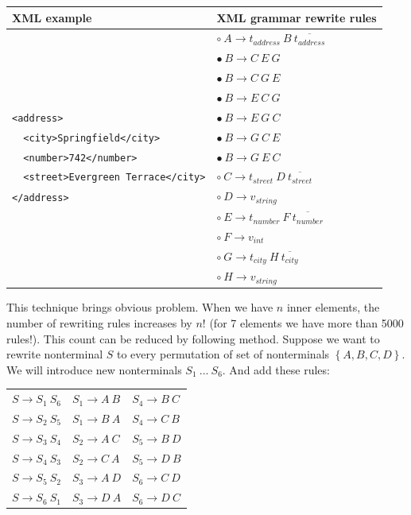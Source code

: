 \documentclass[12pt,notitlepage]{report}
\begin{document}
\begin{center}
\setlength{\tabcolsep}{0.5cm}
\renewcommand{\arraystretch}{1.3}
\begin{tabular}{|l|l|}
\hline
XML example & XML grammar rewrite rules\\ \hline
& $\circ~A \rightarrow t_{address}~B~\overline{t_{address}}$ \\
& $\bullet~B \rightarrow C~E~G$ \\
& $\bullet~B \rightarrow C~G~E$ \\
& $\bullet~B \rightarrow E~C~G$ \\
\texttt{<address>} & $\bullet~B \rightarrow E~G~C$ \\
\texttt{~~<city>Springfield</city>} & $\bullet~B \rightarrow G~C~E$ \\
\texttt{~~<number>742</number>} & $\bullet~B \rightarrow G~E~C$ \\
\texttt{~~<street>Evergreen Terrace</city>} & $\circ~C \rightarrow t_{street}~D~\overline{t_{street}}$ \\
\texttt{</address>} & $\circ~D \rightarrow v_{string}$ \\
& $\circ~E \rightarrow t_{number}~F~\overline{t_{number}}$ \\
& $\circ~F \rightarrow v_{int}$ \\
& $\circ~G \rightarrow t_{city}~H~\overline{t_{city}}$ \\
& $\circ~H \rightarrow v_{string}$ \\ \hline
\end{tabular}
\end{center}

This technique brings obvious problem. When we have $n$ inner elements, the number of rewriting rules increases by $n!$ (for 7 elements we have more than 5000 rules!). This count can be reduced by following method. Suppose we want to rewrite nonterminal $S$ to every permutation of set of nonterminals $\left\lbrace A, B, C, D\right\rbrace$. We will introduce new nonterminals $S_{1}~...~S_{6}$. And add these rules:

\begin{center}
\begin{tabular}{lll}
$S \rightarrow S_{1}~S_{6}$ & $S_{1} \rightarrow A~B$ & $S_{4} \rightarrow B~C$ \\ 
$S \rightarrow S_{2}~S_{5}$ & $S_{1} \rightarrow B~A$ & $S_{4} \rightarrow C~B$ \\ 
$S \rightarrow S_{3}~S_{4}$ & $S_{2} \rightarrow A~C$ & $S_{5} \rightarrow B~D$ \\ 
$S \rightarrow S_{4}~S_{3}$ & $S_{2} \rightarrow C~A$ & $S_{5} \rightarrow D~B$ \\ 
$S \rightarrow S_{5}~S_{2}$ & $S_{3} \rightarrow A~D$ & $S_{6} \rightarrow C~D$ \\ 
$S \rightarrow S_{6}~S_{1}$ & $S_{3} \rightarrow D~A$ & $S_{6} \rightarrow D~C$
\end{tabular}
\end{center}
\end{document}
